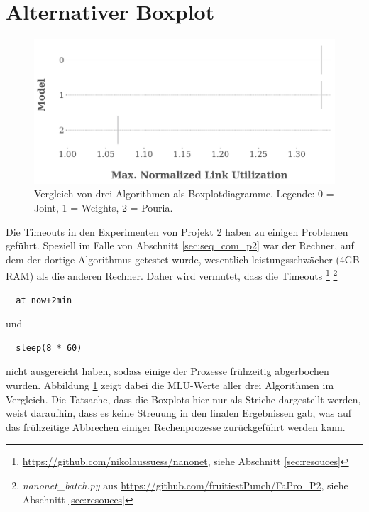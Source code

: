 \documentclass[sigconf, nonacm, review]{acmart}
\begin{document}
\section{Alternativer Boxplot}
\label{sec:alt_boxplot}
\begin{figure}
\centering
\includegraphics[width=\linewidth]{figures/pouria_boxplot_no_real_results.pdf}
\caption{Vergleich von drei Algorithmen als Boxplotdiagramme. Legende: 0 = Joint, 1 = Weights, 2 = Pouria.}
\label{fig:pouria_boxplot_no_real_results}
\end{figure}
Die Timeouts in den Experimenten von Projekt 2 haben zu einigen Problemen gef\"uhrt.
Speziell im Falle von Abschnitt \ref{sec:seq_com_p2} war der Rechner, 
auf dem der dortige Algorithmus getestet wurde,
wesentlich leistungsschw\"acher (4GB RAM) als die anderen Rechner.
Daher wird vermutet, 
dass die Timeouts
\footnote{\url{https://github.com/nikolaussuess/nanonet}, siehe Abschnitt \ref{sec:resouces}}
\footnote{\emph{nanonet\_batch.py} aus \url{https://github.com/fruitiestPunch/FaPro_P2}, siehe Abschnitt \ref{sec:resouces}}
\begin{verbatim}
  at now+2min
\end{verbatim}
und 
\begin{verbatim}
  sleep(8 * 60)
\end{verbatim}
nicht ausgereicht haben, sodass einige der Prozesse fr\"uhzeitig abgerbochen wurden.
Abbildung \ref{fig:pouria_boxplot_no_real_results} zeigt dabei die MLU-Werte aller drei Algorithmen im Vergleich.
Die Tatsache, dass die Boxplots hier nur als Striche dargestellt werden, weist daraufhin, dass es keine Streuung in den finalen Ergebnissen gab,
was auf das fr\"uhzeitige Abbrechen einiger Rechenprozesse zur\"uckgef\"uhrt werden kann.
\balance
\end{document}
